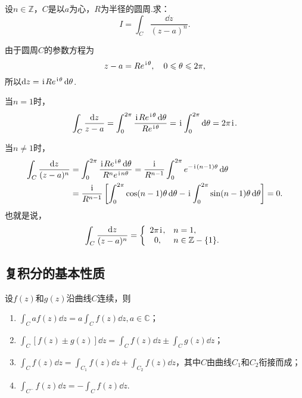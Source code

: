 \begin{example}
设\(n\in\mathbb{Z}\)，\(C\)是以\(a\)为心，\(R\)为半径的圆周.求：\[
I = \int_C \frac{\dd{z}}{(z-a)^n}.
\]
\begin{solution}
由于圆周\(C\)的参数方程为\[
z-a=Re^{\kern1pt\mathrm{i}\kern1pt\theta}, \quad 0 \leqslant \theta \leqslant 2\pi,
\]所以\(\dd{z}=\kern1pt\mathrm{i}\kern1pt R e^{\kern1pt\mathrm{i}\kern1pt\theta} \dd{\theta}\).

当\(n=1\)时，\[
\int_C \frac{\dd{z}}{z-a}
= \int_0^{2\pi}{\frac{\kern1pt\mathrm{i}\kern1pt R e^{\kern1pt\mathrm{i}\kern1pt\theta} \dd{\theta}}{R e^{\kern1pt\mathrm{i}\kern1pt\theta}}}
= \kern1pt\mathrm{i}\kern1pt \int_0^{2\pi}\dd{\theta}
= 2\pi\kern1pt\mathrm{i}\kern1pt.
\]

当\(n \neq 1\)时，\begin{align*}
\int_C{\frac{\dd{z}}{(z-a)^n}}
&= \int_0^{2\pi}{
	\frac{
		\kern1pt\mathrm{i}\kern1pt R e^{\kern1pt\mathrm{i}\kern1pt\theta} \dd{\theta}
	}{
		R^n e^{\kern1pt\mathrm{i}\kern1pt n \theta}
	}
}
= \frac{\kern1pt\mathrm{i}\kern1pt}{R^{n-1}} \int_0^{2\pi}{e^{-\kern1pt\mathrm{i}\kern1pt(n-1)\theta}\dd{\theta}} \\
&= \frac{\kern1pt\mathrm{i}\kern1pt}{R^{n-1}} \left[
	\int_0^{2\pi}{\cos(n-1)\theta\dd{\theta}}
	-\kern1pt\mathrm{i}\kern1pt \int_0^{2\pi}{\sin(n-1)\theta\dd{\theta}}
	\right]
= 0.
\end{align*}
也就是说，\begin{equation}\label{equation.解析函数的积分表示.重要积分1}
\int_C \frac{\dd{z}}{(z-a)^n} = \left\{ \begin{array}{cl}
2\pi\kern1pt\mathrm{i}\kern1pt, & n=1, \\
0, & n\in\mathbb{Z}-\{1\}.
\end{array} \right.
\end{equation}
\end{solution}
\end{example}

\subsection{复积分的基本性质}
\begin{property}
设\(f(z)\)和\(g(z)\)沿曲线\(C\)连续，则\begin{enumerate}
\item \(\int_C a f(z) \dd{z} = a \int_C f(z) \dd{z}, a\in\mathbb{C}\)；
\item \(\int_C [f(z) \pm g(z)] \dd{z} = \int_C f(z) \dd{z} \pm \int_C g(z) \dd{z}\)；
\item \(\int_C f(z) \dd{z} = \int_{C_1} f(z) \dd{z} + \int_{C_2} f(z) \dd{z}\)，其中\(C\)由曲线\(C_1\)和\(C_2\)衔接而成；
\item \(\int_{C^-} f(z) \dd{z} = -\int_C f(z) \dd{z}\).
\end{enumerate}
\end{property}

